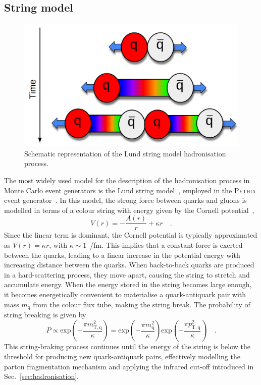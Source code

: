 \subsection{String model}
\begin{figure}[htb]
    \centering
    \includegraphics[width=0.7\linewidth]{Figures/Chapter 2/Lund.png}
    \caption{Schematic representation of the Lund string model hadronisation process.}
    \label{fig:Lund}
\end{figure}
The most widely used model for the description of the hadronisation process in Monte Carlo event generators is the Lund string model~\cite{Andersson:1983ia}, employed in the \textsc{Pythia} event generator~\cite{Bierlich:2022pfr}. In this model, the strong force between quarks and gluons is modelled in terms of a colour string with energy given by the Cornell potential~\cite{Eichten:1974af},
\begin{equation*}
    V(r) = -\frac{A(r)}{r} + \kappa r\quad .
\end{equation*}
Since the linear term is dominant, the Cornell potential is typically approximated as $V(r) = \kappa r$, with $\kappa\sim1$~\gev/fm. This implies that a constant force is exerted between the quarks, leading to a linear increase in the potential energy with increasing distance between the quarks. When back-to-back quarks are produced in a hard-scattering process, they move apart, causing the string to stretch and accumulate energy. When the energy stored in the string becomes large enough, it becomes energetically convenient to materialise a quark-antiquark pair with mass $m_\mathrm{q}$ from the colour flux tube, making the string break. The probability of string breaking is given by~\cite{Andersson:1983jt}
\begin{equation}\label{eq:P_string_breaking}
    P \propto \mathrm{exp}\left(-\frac{\pi m_\mathrm{T,q}^2}{\kappa}\right) = \mathrm{exp}\left(-\frac{\pi m_\mathrm{q}^2}{\kappa}\right) \mathrm{exp}\left(-\frac{\pi p_\mathrm{T,q}^2}{\kappa}\right)\quad .
\end{equation}
This string-braking process continues until the energy of the string is below the threshold for producing new quark-antiquark pairs, effectively modelling the parton fragmentation mechanism and applying the infrared cut-off introduced in Sec.~\ref{sec:hadronisation}.

